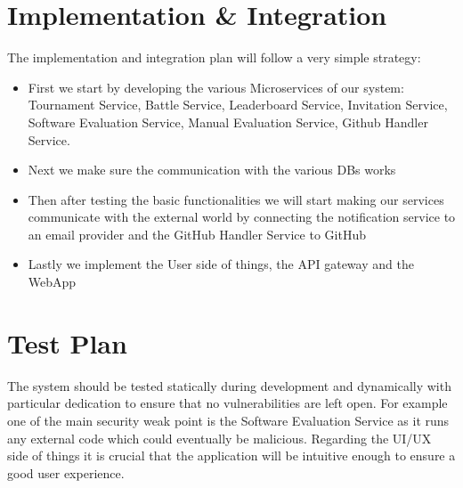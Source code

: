 \section{Implementation \& Integration}
The implementation and integration plan will follow a very simple strategy:
\begin{itemize}
    \item First we start by developing the various Microservices of our system: Tournament Service, Battle Service, Leaderboard Service, Invitation Service, Software Evaluation Service, Manual Evaluation Service, Github Handler Service.
    \item Next we make sure the communication with the various DBs works
    \item Then after testing the basic functionalities we will start making our services communicate with the external world by connecting the notification service to an email provider and the GitHub Handler Service to GitHub
    \item Lastly we implement the User side of things, the API gateway and the WebApp
\end{itemize}

\section{Test Plan}
The system should be tested statically during development and dynamically with particular dedication to ensure that no vulnerabilities are left open. For example one of the main security weak point is the Software Evaluation Service as it runs any external code which could eventually be malicious. Regarding the UI/UX side of things it is crucial that the application will be intuitive enough to ensure a good user experience.